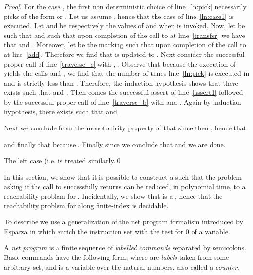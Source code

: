 \documentclass{fsttcs}
\begin{document}
\begin{proof}
For the case , the first non deterministic choice of line~\ref{ln:pick}
necessarily picks  of the form  or . Let us assume 
, hence that the case of
line~\ref{ln:case1} is executed.  Let  and  be respectively
the values of  and 
when  is invoked. Now, let
 be such that 
and such that upon completion of the call to  at
line~\ref{transfer} we have that 
and .  Moreover, let  be the
marking such that  upon completion of the
call to  at line~\ref{add}. Therefore we find that
 is updated to .
Next consider the successful proper call  of line~\ref{traverse_c} with
, .
Observe that because the execution of  yields the calls
 and , we find that the
number of times line~\ref{ln:pick} is executed in  and 
is strictly less than .
Therefore, the induction hypothesis shows that there exists  such that
 and .  Then
comes the successful assert of line~\ref{assert1} followed by the successful
proper call  of line~\ref{traverse_b} with
 and
.
Again by induction hypothesis, there exists  such that
 and .

Next we conclude from the monotonicity property of  that since
 then
, hence
that

and finally that  because .  Finally since
 we
conclude that  and we are
done.

The left case (i.e.  is treated similarly.\qed
\end{proof}
\pagebreak
 

 In this section, we  show that it is possible to construct a   such
that  the problem asking if the call to
 successfully returns  can be reduced, in
polynomial time, to a reachability problem for .
Incidentally, we show that  is a , hence that the reachability problem for  along
finite-index  is decidable.

To describe  we use a generalization of the net program formalism introduced
by Esparza in \cite{esparza-course} which enrich the instruction set with the test for 0 of a variable.

A \emph{net program} is a finite sequence of \emph{labelled commands} separated by
semicolons.  Basic commands have the following form, where
 are \emph{labels} taken from some arbitrary set,
and  is a variable over the natural numbers, also called a \emph{counter}.

\medskip
\end{document}
